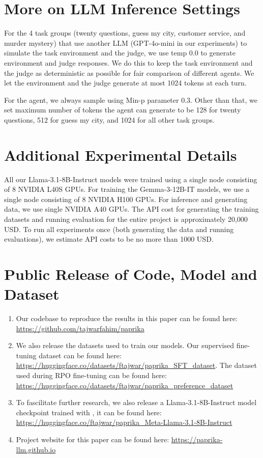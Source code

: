 \newpage

\section{More on LLM Inference Settings}

For the 4 task groups (twenty questions, guess my city, customer service, and murder mystery) that use another LLM (GPT-4o-mini in our experiments) to simulate the task environment and the judge, we use temp 0.0 to generate environment and judge responses. We do this to keep the task environment and the judge as deterministic as possible for fair comparison of different agents. We let the environment and the judge generate at most 1024 tokens at each turn.

For the agent, we always sample using Min-p parameter $0.3$. Other than that, we set maximum number of tokens the agent can generate to be  128 for twenty questions, 512 for guess my city, and 1024 for all other task groups. 

\section{Additional Experimental Details}

All our Llama-3.1-8B-Instruct models were trained using a single node consisting of 8 NVIDIA L40S GPUs. For training the Gemma-3-12B-IT models, we use a single node consisting of 8 NVIDIA H100 GPUs. For inference and generating data, we use single NVIDIA A40 GPUs. The API cost for generating the training datasets and running evaluation for the entire project is approximately 20,000 USD. To run all experiments once (both generating the data and running evaluations), we estimate API costs to be no more than 1000 USD.

\section{Public Release of Code, Model and Dataset}

\begin{enumerate}
    \item Our codebase to reproduce the results in this paper can be found here: \url{https://github.com/tajwarfahim/paprika}
    \item We also release the datasets used to train our models. Our supervised fine-tuning dataset can be found here: \url{https://huggingface.co/datasets/ftajwar/paprika_SFT_dataset}. The dataset used during RPO fine-tuning can be found here: \url{https://huggingface.co/datasets/ftajwar/paprika_preference_dataset}
    \item To fascilitate further research, we also release a Llama-3.1-8B-Instruct model checkpoint trained with \ours{}, it can be found here: \url{https://huggingface.co/ftajwar/paprika_Meta-Llama-3.1-8B-Instruct}
    \item Project website for this paper can be found here: \url{https://paprika-llm.github.io}
\end{enumerate}

